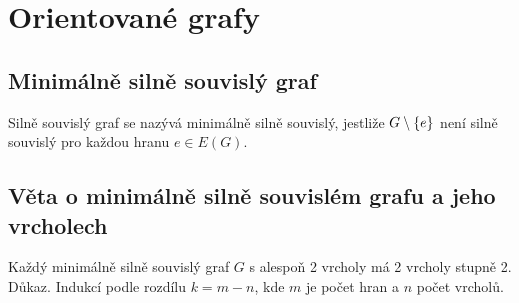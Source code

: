 \section{Orientované grafy}
\subsection{Minimálně silně souvislý graf}
Silně souvislý graf se nazývá minimálně silně souvislý, jestliže $G \setminus \left\lbrace e \right\rbrace$ není silně souvislý pro každou 
hranu $e \in E(G)$.

\subsection{Věta o minimálně silně souvislém grafu a jeho vrcholech}
Každý minimálně silně souvislý graf $G$ s alespoň 2 vrcholy má 2 vrcholy stupně 2.\\
Důkaz. Indukcí podle rozdílu $k = m -n$, kde $m$ je počet hran a $n$ počet vrcholů.
